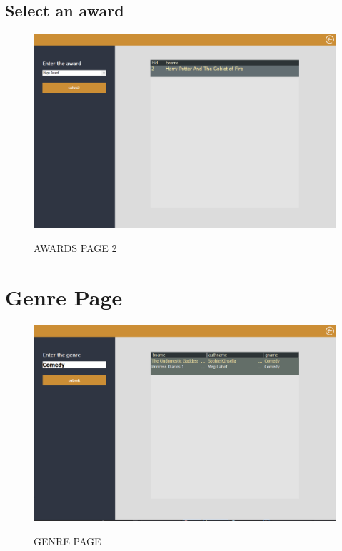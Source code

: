 \subsection{Select an award}
\begin{figure}[H]
\centering
\caption{AWARDS PAGE 2}
\includegraphics[scale=.5]{./ssawards2.png}
\\[0.2in]
\label{fig:award1}
\end{figure}
\thispagestyle{fancy}
\section{Genre Page}
\begin{figure}[H]
\centering
\caption{GENRE PAGE}
\includegraphics[scale=.5]{./ssgenre.png}
\\[0.2in]
\label{fig:genre}
\end{figure}
\thispagestyle{fancy}
